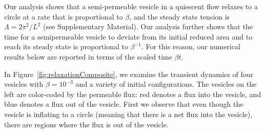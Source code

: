 \documentclass[9pt,twocolumn,twoside,lineno]{pnas-new}
\begin{document}
Our analysis shows that a semi-permeable vesicle in a quiescent flow
relaxes to a circle at a rate that is proportional to $\beta$, and the
steady state tension is $\Lambda = 2\pi^2/L^2$ (see Supplementary
Material). Our analysis further shows that the time for a semipermeable
vesicle to deviate from its initial reduced area and to reach its steady
state is proportional to $\beta^{-1}$. For this reason, our numerical
results below are reported in terms of the scaled time $\beta t$.


In Figure~\ref{fig:relaxationComposite}, we examine the transient
dynamics of four vesicles with $\beta = 10^{-3}$ and a variety of
initial configurations. The vesicles on the left are color-coded by the permeable flux: red denotes a flux into the vesicle, and blue denotes a flux out of the vesicle.
First we observe
that even though the vesicle is inflating to a circle (meaning that
there is a net flux into the vesicle), there are regions where the flux
is out of the vesicle. 
\end{document}
